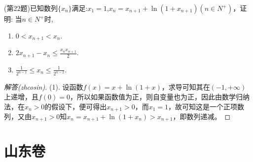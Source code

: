 \documentclass{ctexart}
\begin{document}
\begin{exercise}(第22题)已知数列$\{x_n\}$满足:$x_1=1$,$x_n=x_{n+1}+\ln{(1+x_{n+1})}(n \in N^+)$，证明: 当$n \in N^+$时,
  \begin{enumerate}
  \item $0<x_{n+1}<x_n$.
  \item $2x_{n+1}-x_n \leqslant \frac{x_nx_{n+1}}{2}$.
  \item $\frac{1}{2^{n-1}} \leqslant x_n \leqslant \frac{1}{2^{n-2}}$.
  \end{enumerate}
\end{exercise}

\begin{proof}[解答(zhcosin)]
  (1). 设函数$f(x)=x+\ln{(1+x)}$，求导可知其在$(-1,+\infty)$上递增，且$f(0)=0$，所以如果函数值为正，则自变量也为正，因此由数学归纳法，在$x_n>0$的假设下，便可得出$x_{n+1}>0$，而$x_1=1$，故可知这是一个正项数列，又由$x_{n+1}>0$知$x_n=x_{n+1}+\ln{(1+x_n)}>x_{n+1}$，即数列递减。
\end{proof}

\section{山东卷}
\label{sec:shandong}
\end{document}
